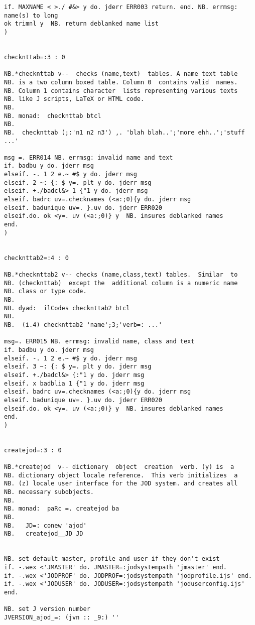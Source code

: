 \begin{lstlisting}[frame=single,framerule=0pt,basicstyle=\ttfamily\tiny]
if. MAXNAME < >./ #&> y do. jderr ERR003 return. end. NB. errmsg: name(s) to long
ok trimnl y  NB. return deblanked name list
)


checknttab=:3 : 0

NB.*checknttab v--  checks (name,text)  tables. A name text table
NB. is a two column boxed table. Column 0  contains valid  names.
NB. Column 1 contains character  lists representing various texts
NB. like J scripts, LaTeX or HTML code.
NB.
NB. monad:  checknttab btcl
NB.
NB.  checknttab (;:'n1 n2 n3') ,. 'blah blah..';'more ehh..';'stuff ...'

msg =. ERR014 NB. errmsg: invalid name and text
if. badbu y do. jderr msg
elseif. -. 1 2 e.~ #$ y do. jderr msg
elseif. 2 ~: {: $ y=. plt y do. jderr msg
elseif. +./badcl&> 1 {"1 y do. jderr msg
elseif. badrc uv=.checknames (<a:;0){y do. jderr msg
elseif. badunique uv=. }.uv do. jderr ERR020
elseif.do. ok <y=. uv (<a:;0)} y  NB. insures deblanked names
end.
)


checknttab2=:4 : 0

NB.*checknttab2 v-- checks (name,class,text) tables.  Similar  to
NB. (checknttab)  except the  additional column is a numeric name
NB. class or type code.
NB.
NB. dyad:  ilCodes checknttab2 btcl
NB.
NB.  (i.4) checknttab2 'name';3;'verb=: ...'

msg=. ERR015 NB. errmsg: invalid name, class and text
if. badbu y do. jderr msg
elseif. -. 1 2 e.~ #$ y do. jderr msg
elseif. 3 ~: {: $ y=. plt y do. jderr msg
elseif. +./badcl&> {:"1 y do. jderr msg
elseif. x badblia 1 {"1 y do. jderr msg
elseif. badrc uv=.checknames (<a:;0){y do. jderr msg
elseif. badunique uv=. }.uv do. jderr ERR020
elseif.do. ok <y=. uv (<a:;0)} y  NB. insures deblanked names
end.
)


createjod=:3 : 0

NB.*createjod  v-- dictionary  object  creation  verb. (y) is  a
NB. dictionary object locale reference.  This verb initializes  a
NB. (z) locale user interface for the JOD system. and creates all
NB. necessary subobjects.
NB.
NB. monad:  paRc =. createjod ba
NB.
NB.   JD=: conew 'ajod'
NB.   createjod__JD JD


NB. set default master, profile and user if they don't exist
if. -.wex <'JMASTER' do. JMASTER=:jodsystempath 'jmaster' end.
if. -.wex <'JODPROF' do. JODPROF=:jodsystempath 'jodprofile.ijs' end.
if. -.wex <'JODUSER' do. JODUSER=:jodsystempath 'joduserconfig.ijs' end.

NB. set J version number 
JVERSION_ajod_=: (jvn :: _9:) ''  


\end{lstlisting}
